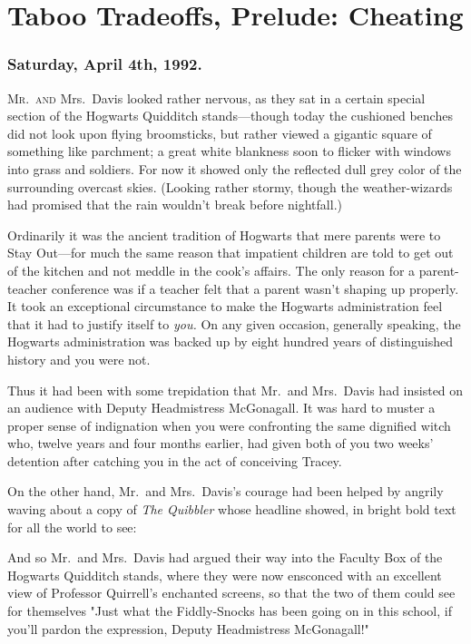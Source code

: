 \chapter{Taboo Tradeoffs, Prelude: Cheating}

\subsection{Saturday, April 4th, 1992.}

\lettrine{M}{r.~and} Mrs.~Davis looked rather nervous, as they sat in a certain special
section of the Hogwarts Quidditch stands---though today the cushioned benches
did not look upon flying broomsticks, but rather viewed a gigantic square of
something like parchment; a great white blankness soon to flicker with windows
into grass and soldiers. For now it showed only the reflected dull grey color
of the surrounding overcast skies. (Looking rather stormy, though the
weather-wizards had promised that the rain wouldn't break before nightfall.)

Ordinarily it was the ancient tradition of Hogwarts that mere parents were to
Stay Out---for much the same reason that impatient children are told to get out
of the kitchen and not meddle in the cook's affairs. The only reason for a
parent-teacher conference was if a teacher felt that a parent wasn't shaping up
properly. It took an exceptional circumstance to make the Hogwarts
administration feel that it had to justify itself to \emph{you.} On any given
occasion, generally speaking, the Hogwarts administration was backed up by
eight hundred years of distinguished history and you were not.

Thus it had been with some trepidation that Mr.~and Mrs.~Davis had insisted on
an audience with Deputy Headmistress McGonagall. It was hard to muster a proper
sense of indignation when you were confronting the same dignified witch who,
twelve years and four months earlier, had given both of you two weeks'
detention after catching you in the act of conceiving Tracey.

On the other hand, Mr.~and Mrs.~Davis's courage had been helped by angrily
waving about a copy of \emph{The Quibbler} whose headline showed, in bright
bold text for all the world to see:


And so Mr.~and Mrs.~Davis had argued their way into the Faculty Box of the
Hogwarts Quidditch stands, where they were now ensconced with an excellent view
of Professor Quirrell's enchanted screens, so that the two of them could see
for themselves "Just what the Fiddly-Snocks has been going on in this school,
if you'll pardon the expression, Deputy Headmistress McGonagall!"


